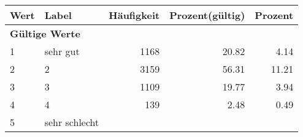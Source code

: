      \begin{longtable}{lXrrr}
     \toprule
     \textbf{Wert} & \textbf{Label} & \textbf{Häufigkeit} & \textbf{Prozent(gültig)} & \textbf{Prozent} \\
     \endhead
     \midrule
     \multicolumn{5}{l}{\textbf{Gültige Werte}}\\

     1 &
     \multicolumn{1}{X}{ sehr gut   } &


       \num{1168} &
       \num[round-mode=places,round-precision=2]{20,82} &
         \num[round-mode=places,round-precision=2]{4,14} \\

     2 &
     \multicolumn{1}{X}{ 2   } &


       \num{3159} &
       \num[round-mode=places,round-precision=2]{56,31} &
         \num[round-mode=places,round-precision=2]{11,21} \\

     3 &
     \multicolumn{1}{X}{ 3   } &


       \num{1109} &
       \num[round-mode=places,round-precision=2]{19,77} &
         \num[round-mode=places,round-precision=2]{3,94} \\

     4 &
     \multicolumn{1}{X}{ 4   } &


       \num{139} &
       \num[round-mode=places,round-precision=2]{2,48} &
         \num[round-mode=places,round-precision=2]{0,49} \\

     5 &
     \multicolumn{1}{X}{ sehr schlecht   } &



\end{longtable}
